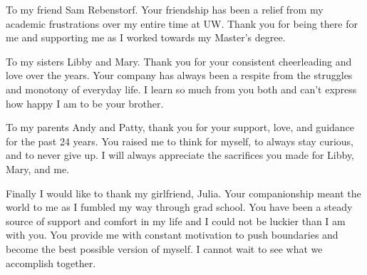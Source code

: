 To my friend Sam Rebenstorf. Your friendship has been a relief from 
my academic frustrations over my entire time at UW. Thank you for being there
for me and supporting me as I worked towards my Master's degree.

To my sisters Libby and Mary. Thank you for your consistent cheerleading and
love over the years. Your company has always been a respite from the struggles
and monotony of everyday life. I learn so much from you both and can't express
how happy I am to be your brother.

To my parents Andy and Patty, thank you for your support, love, and guidance for
the past 24 years. You raised me to think for myself, to always stay curious,
and to never give up. I will always appreciate the sacrifices you made for 
Libby, Mary, and me.

Finally I would like to thank my girlfriend, Julia. Your companionship meant
the world to me as I fumbled my way through grad school. You have been
a steady source of support and comfort in my life and I could not be luckier
than I am with you. You provide me with constant motivation to push 
boundaries and become the best possible version of myself. 
I cannot wait to see what we accomplish together.
